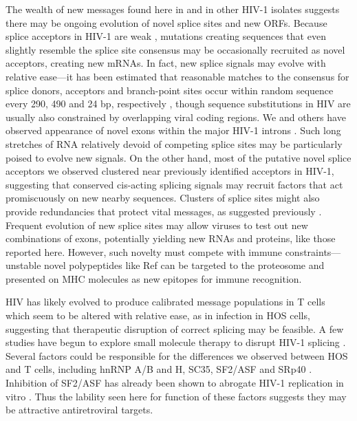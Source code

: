 \documentclass[../sherrill-Mix_thesis.tex]{subfiles}
\begin{document}
The wealth of new messages found here in \hivEight{} and in other HIV-1 isolates suggests there may be ongoing evolution of novel splice sites and new ORFs. Because splice acceptors in HIV-1 are weak \citep{Stoltzfus2009}, mutations creating sequences that even slightly resemble the \threePrime{} splice site consensus may be occasionally recruited as novel acceptors, creating new mRNAs. In fact, new splice signals may evolve with relative ease---it has been estimated that reasonable matches to the consensus for splice donors, acceptors and branch-point sites occur within random sequence every 290, 490 and 24 bp, respectively \citep{Burge1999}, though sequence substitutions in HIV are usually also constrained by overlapping viral coding regions. We and others have observed appearance of novel exons within the major HIV-1 introns \citep{Benko1990,Lutzelberger2006,Salfeld1990}. Such long stretches of RNA relatively devoid of competing splice sites may be particularly poised to evolve new signals. On the other hand, most of the putative novel splice acceptors we observed clustered near previously identified acceptors in HIV-1, suggesting that conserved cis-acting splicing signals may recruit factors that act promiscuously on new nearby sequences. Clusters of splice sites might also provide redundancies that protect vital messages, as suggested previously \citep{Abbink2008,Verhoef2001}. Frequent evolution of new splice sites may allow viruses to test out new combinations of exons, potentially yielding new RNAs and proteins, like those reported here. However, such novelty must compete with immune constraints---unstable novel polypeptides like Ref can be targeted to the proteosome and presented on MHC molecules as new epitopes for immune recognition.

HIV has likely evolved to produce calibrated message populations in T cells which seem to be altered with relative ease, as in infection in HOS cells, suggesting that therapeutic disruption of correct splicing may be feasible. A few studies have begun to explore small molecule therapy to disrupt HIV-1 splicing \citep{Bakkour2007,Tranell2011}. Several factors could be responsible for the differences we observed between HOS and T cells, including hnRNP A/B and H, SC35, SF2/ASF and SRp40 \citep{Caputi2004,Zahler2004}. Inhibition of SF2/ASF has already been shown to abrogate HIV-1 replication in vitro \citep{Bakkour2007}. Thus the lability seen here for function of these factors suggests they may be attractive antiretroviral targets. 
\end{document}
